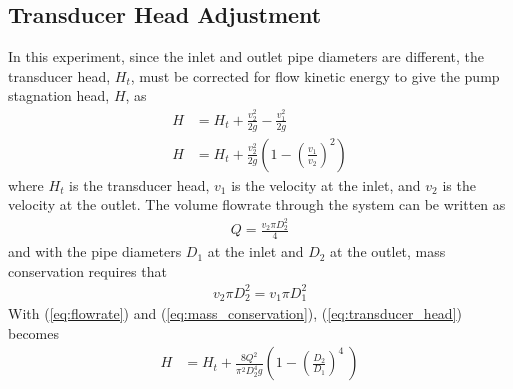 \subsection{Transducer Head Adjustment}
In this experiment, since the inlet and outlet pipe diameters are different, the transducer head, $H_t$, must be corrected for flow kinetic energy to give the pump stagnation head, $H$, as
\begin{align}
    H &= H_t + \frac{v_2^2}{2g} - \frac{v_1^2}{2g} \nonumber \\
    H &= H_t + \frac{v_2^2}{2g} \left(1 - \left(\frac{v_1}{v_2}\right)^2\right) \label{eq:transducer_head}
\end{align}
where $H_t$ is the transducer head, $v_1$ is the velocity at the inlet, and $v_2$ is the velocity at the outlet. The volume flowrate through the system can be written as
\begin{align}
    Q = \frac{v_2 \pi D_2^2}{4} \label{eq:flowrate}
\end{align}
and with the pipe diameters $D_1$ at the inlet and $D_2$ at the outlet, mass conservation requires that
\begin{align}
    v_2 \pi D_2^2 = v_1 \pi D_1^2 \label{eq:mass_conservation}
\end{align}
With (\ref{eq:flowrate}) and (\ref{eq:mass_conservation}), (\ref{eq:transducer_head}) becomes
\begin{align}
    H &= H_t + \frac{8Q^2}{\pi^2 D_2^4 g} \left(1 - \left(\frac{D_2}{D_1}\right)^4\ \right) \label{eq:transducer_head2}
\end{align}

